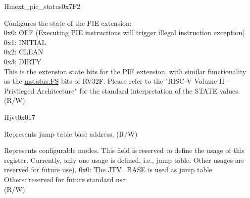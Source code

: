 \begin{register}{H}{mext\_pie\_status}{0x7F2}\label{regdesc:MEXT_PIE_STATUS}%
%
%
\regnewline%
\begin{regdesc}\begin{reglist}
\label{fielddesc:MEXT_PIE_STATE}\item [STATE] Configures the state of the PIE extension: \\
0x0: OFF (Executing PIE instructions will trigger illegal instruction exception) \\
0x1: INITIAL \\
0x2: CLEAN \\
0x3: DIRTY \\
This is the extension state bits for the PIE extension, with similar functionality as the \hyperref[fielddesc:MSTATUS_FS]{mstatus.FS} bits of RV32F. Please refer to the "RISC-V Volume II - Privileged Architecture" for the standard interpretation of the STATE values. \\
(R/W)
\end{reglist}\end{regdesc}
\end{register}


\begin{register}{H}{jvt}{0x017}\label{regdesc:JVT}%
%
%
\regnewline%
\begin{regdesc}\begin{reglist}
\label{fielddesc:JVT_BASE}\item [BASE] Represents jump table base address. (R/W)
\label{fielddesc:JVT_MODE}\item [MODE] Represents configurable modes. This field is reserved to define the usage of this register. Currently, only one usage is defined, i.e., jump table. Other usages are reserved for future use).
0x0: The \hyperref[fielddesc:JVT_BASE]{JTV\_BASE} is used as jump table \\
Others: reserved for future standard use \\
(R/W)
\end{reglist}\end{regdesc}
\end{register}

